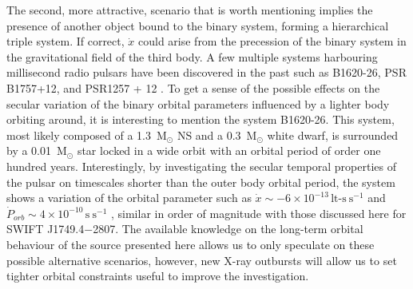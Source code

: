 \documentclass[fleqn,usenatbib]{mnras}
\newcommand{\swiftj}{SWIFT J1749.4$-$2807}
\begin{document}
The second, more attractive, scenario that is worth mentioning implies the presence of another object bound to the binary system, forming a hierarchical triple system. If correct, $\dot{x}$ could arise from the precession of the binary system in the gravitational field of the third body. A few multiple systems harbouring millisecond radio pulsars have been discovered in the past such as B1620-26, PSR B1757+12, and PSR1257 + 12 \citep[see e.g.,][]{Thorsett:1999vo, Wolszczan:1992wd, Ransom:2014vb}. To get a sense of the possible effects on the secular variation of the binary orbital parameters influenced by a lighter body orbiting around, it is interesting to mention the system B1620-26. This system, most likely composed of a 1.3~M$_\odot$ NS and a 0.3~M$_\odot$ white dwarf, is surrounded by a 0.01~M$_\odot$ star locked in a wide orbit with an orbital period of order one hundred years. Interestingly, by investigating the secular temporal properties of the pulsar on timescales shorter than the outer body orbital period, the system shows a variation of the orbital parameter such as $\dot{x}\sim -6\times 10^{-13}\,\text{lt-s}~\text{s}^{-1}$ and $\dot{P}_{orb}\sim4\times 10^{-10}\,\text{s}~\text{s}^{-1}$ \citep{Thorsett:1999vo}, similar in order of magnitude with those discussed here for \swiftj{}. The available knowledge on the long-term orbital behaviour of the source presented here allows us to only speculate on these possible alternative scenarios, however, new X-ray outbursts will allow us to set tighter orbital constraints useful to improve the investigation.    
\end{document}
